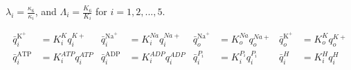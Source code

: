 $\lambda_i=\frac{\kappa_6}{\kappa_i}$, and $\Lambda_i=\frac{K_6}{K_i}$ for $i=1,2,...,5$.

\begin{align*}
\bar{q}_i^{\mathrm{K}^+} & = K_i^Kq_i^{K+} & \bar{q}_i^{\mathrm{Na}^+} & = K_i^{Na}q_i^{Na+} & \bar{q}_o^{\mathrm{Na}^+} & = K_o^{Na}q_o^{Na+} & \bar{q}_o^{\mathrm{K}^+} & = K_o^{K}q_o^{K+}\\
\bar{q}_i^{\mathrm{ATP}} & = K_i^{ATP}q_i^{ATP} & \bar{q}_i^{\mathrm{ADP}} & = K_i^{ADP}q_i^{ADP} & \bar{q}_i^{P_i} & = K_i^{P_i}q_i^{P_i} & \bar{q}_i^{H} & = K_i^{H}q_i^{H} \\
\end{align*}


